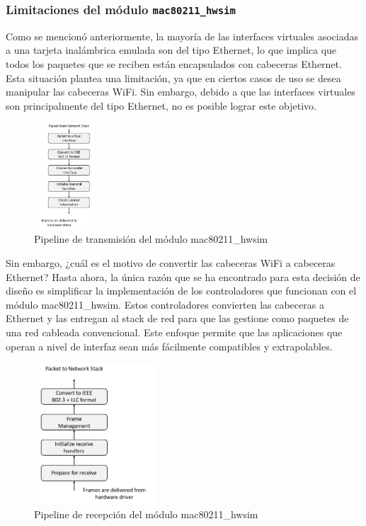 \subsubsection{Limitaciones del módulo \texttt{mac80211\_hwsim}}
\label{limits}

Como se mencionó anteriormente, la mayoría de las interfaces virtuales asociadas a una tarjeta inalámbrica emulada son del tipo Ethernet, lo que implica que todos los paquetes que se reciben están encapsulados con cabeceras Ethernet. Esta situación plantea una limitación, ya que en ciertos casos de uso se desea manipular las cabeceras WiFi. Sin embargo, debido a que las interfaces virtuales son principalmente del tipo Ethernet, no es posible lograr este objetivo.

\begin{figure}[ht]
    \centering
    \includegraphics[width=0.2\textwidth]{archivos/img/dev/p4-wifi/analysis/linux_wireless_subsystem_tx.png}
    \caption{Pipeline de transmisión del módulo mac80211\_hwsim \cite{5415877}}
    \label{fig:analysis_p4_wifi_7}
\end{figure}

Sin embargo, ¿cuál es el motivo de convertir las cabeceras WiFi a cabeceras Ethernet? Hasta ahora, la única razón que se ha encontrado para esta decisión de diseño es simplificar la implementación de los controladores que funcionan con el módulo mac80211\_hwsim. Estos controladores convierten las cabeceras a Ethernet y las entregan al stack de red para que las gestione como paquetes de una red cableada convencional. Este enfoque permite que las aplicaciones que operan a nivel de interfaz sean más fácilmente compatibles y extrapolables.

\begin{figure}[ht]
    \centering
    \includegraphics[width=0.4\textwidth]{archivos/img/dev/p4-wifi/analysis/linux_wireless_subsystem_rx.png}
    \caption{Pipeline de recepción del módulo mac80211\_hwsim \cite{5415877}}
    \label{fig:analysis_p4_wifi_8}
\end{figure}

